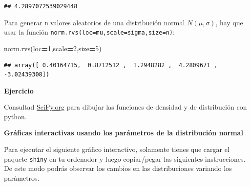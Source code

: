\documentclass[]{book}
\newenvironment{Shaded}{\begin{snugshade}}{\end{snugshade}}
\newcommand{\DecValTok}[1]{\textcolor[rgb]{0.00,0.00,0.81}{#1}}
\newcommand{\NormalTok}[1]{#1}
\newcommand{\OperatorTok}[1]{\textcolor[rgb]{0.81,0.36,0.00}{\textbf{#1}}}
\begin{document}
\begin{verbatim}
## 4.2897072539029448
\end{verbatim}

Para generar \texttt{n} valores aleatorios de una distribución normal \(N(\mu,\sigma)\), hay que usar la función \texttt{norm.rvs(loc=mu,scale=sigma,size=n)}:

\begin{Shaded}
\begin{Highlighting}[]
\NormalTok{norm.rvs(loc}\OperatorTok{=}\DecValTok{1}\NormalTok{,scale}\OperatorTok{=}\DecValTok{2}\NormalTok{,size}\OperatorTok{=}\DecValTok{5}\NormalTok{)}
\end{Highlighting}
\end{Shaded}

\begin{verbatim}
## array([ 0.40164715,  0.8712512 ,  1.2948282 ,  4.2809671 , -3.02439308])
\end{verbatim}

\textbf{Ejercicio}

Consultad \href{https://docs.scipy.org/doc/scipy/reference/generated/scipy.stats.norm.html}{SciPy.org} para dibujar las funciones de densidad y de distribución con python.

\textbf{Gráficas interactivas usando los parámetros de la distribución normal}

Para ejecutar el siguiente gráfico interactivo, solamente tienes que cargar el paquete \texttt{shiny} en tu ordenador y luego copiar/pegar las siguientes instrucciones. De este modo podrás observar los cambios en las distribuciones variando los parámetros.
\end{document}

